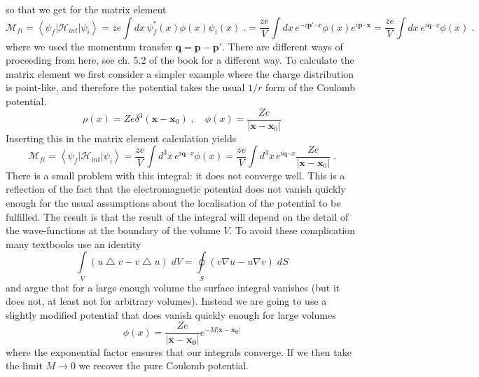 \documentclass[12pt]{article}
\newcommand{\V}[1]{\mathbf{#1}}
\begin{document}
so that we get for the matrix element
\[\mathcal{M}_{fi}=\left<\psi_f|\mathcal{H}_{int}|\psi_i\right>
=ze\int dx\,\psi_f^*(x)\phi(x)\psi_i(x)\;.
=\frac{ze}{V}\int dx\,e^{-i\V{p'}\cdot x}\phi(x)e^{i\V{p}\cdot\V{x}}
=\frac{ze}{V}\int dx\,e^{i\V{q}\cdot x}\phi(x)\;.
\]
where we used the momentum transfer $\V{q}=\V{p}-\V{p'}$. There are different ways of proceeding from here, see ch. 5.2 of the book for a different way. To calculate the matrix element we first consider a simpler example where the charge distribution is point-like, and therefore the potential takes the usual $1/r$ form of the Coulomb potential. 
\[\rho(x)=Ze\delta^{3}(\V{x}-\V{x}_0)\;,\quad \phi(x)=\frac{Ze}{\left|\V{x}-\V{x}_0\right|}\] 
Inserting this in the matrix element calculation yields
\[\mathcal{M}_{fi}=\left<\psi_f|\mathcal{H}_{int}|\psi_i\right>
=\frac{ze}{V}\int d^3x\,e^{i\V{q}\cdot x}\phi(x)
=\frac{ze}{V}\int d^3x\,e^{i\V{q}\cdot x}\frac{Ze}{\left|\V{x}-\V{x}_0\right|}
\;.
\]
There is a small problem with this integral: it does not converge well. This is a reflection of the fact that the electromagnetic potential does not vanish quickly enough for the usual assumptions about the localisation of the potential to be fulfilled. The result is that the result of the integral will depend on the detail of the wave-functions at the boundary of the volume $V$. To avoid these complication many textbooks use an identity
\[\int\limits_V\left(u\bigtriangleup v-v\bigtriangleup u\right)\;dV = \oint\limits_{S} \left(v\nabla u - u\nabla v \right)\;dS\]
and argue that for a large enough volume the surface integral vanishes (but it does not, at least not for arbitrary volumes). Instead we are going to use a slightly modified potential that does vanish quickly enough for large volumes 
\[\phi(x)=\frac{Ze}{|\V{x}-\V{x_0}|}e^{-M |\V{x}-\V{x_0}|}\]
where the exponential factor ensures that our integrals converge. If we then take the limit $M\rightarrow 0$ we recover the pure Coulomb potential. 
\end{document}
